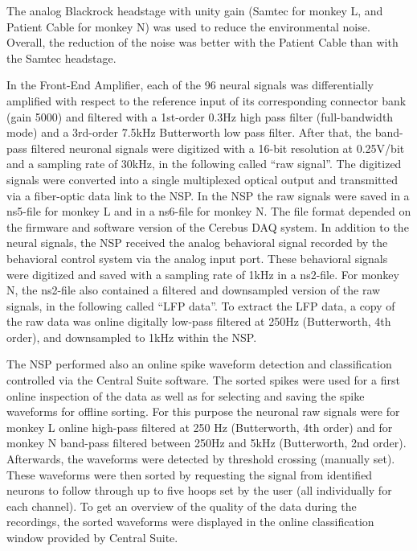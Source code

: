 The analog Blackrock headstage with unity gain (Samtec for monkey L, and Patient Cable for monkey N) was used to reduce the environmental noise. Overall, the reduction of the noise was better with the Patient Cable than with the Samtec headstage.

In the Front-End Amplifier, each of the 96 neural signals was differentially amplified with respect to the reference input of its corresponding connector bank (gain 5000) and filtered with a 1st-order 0.3Hz high pass filter (full-bandwidth mode) and a 3rd-order 7.5kHz Butterworth low pass filter. After that, the band-pass filtered neuronal signals were digitized with a 16-bit resolution at 0.25V/bit and a sampling rate of 30kHz, in the following called “raw signal”. The digitized signals were converted into a single multiplexed optical output and transmitted via a fiber-optic data link to the NSP. In the NSP the raw signals were saved in a ns5-file for monkey L and in a ns6-file for monkey N. The file format depended on the firmware and software version of the Cerebus DAQ system. In addition to the neural signals, the NSP received the analog behavioral signal recorded by the behavioral control system via the analog input port. These behavioral signals were digitized and saved with a sampling rate of 1kHz in a ns2-file. For monkey N, the ns2-file also contained a filtered and downsampled version of the raw signals, in the following called “LFP data”. To extract the LFP data, a copy of the raw data was online digitally low-pass filtered at 250Hz (Butterworth, 4th order), and downsampled to 1kHz within the NSP.

The NSP performed also an online spike waveform detection and classification controlled via the Central Suite software. The sorted spikes were used for a first online inspection of the data as well as for selecting and saving the spike waveforms for offline sorting. For this purpose the neuronal raw signals were for monkey L online high-pass filtered at 250 Hz (Butterworth, 4th order) and for monkey N band-pass filtered between 250Hz and 5kHz (Butterworth, 2nd order). Afterwards, the waveforms were detected by threshold crossing (manually set). These waveforms were then sorted by requesting the signal from identified neurons to follow through up to five hoops set by the user (all individually for each channel). To get an overview of the quality of the data during the recordings, the sorted waveforms were displayed in the online classification window provided by Central Suite.

